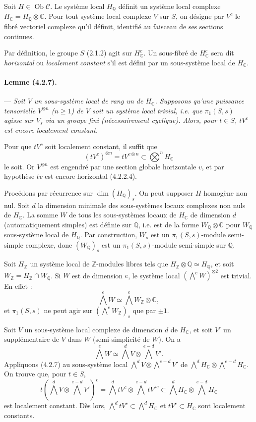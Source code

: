 \documentclass[10pt]{article}
\newcommand{\C}{\mathbb C}
\newcommand{\Q}{\mathbb Q}
\newcommand{\Z}{\mathbb Z}
\newcommand{\fg}{\guillemotright}
\newcommand{\og}{\guillemotleft}
\newcommand{\Ob}{\operatorname{Ob}}
\begin{document}
Soit $H\in\Ob\mathcal C$. Le système local $H_\Q$ définit un système local complexe $H_\C=H_\Q\otimes\C$. Pour tout système local complexe $V$ sur $S$, on désigne par $V^c$ le fibré vectoriel complexe qu'il définit, identifié au faisceau de ses sections continues.

Par définition, le groupe $S$ (2.1.2) agit sur $H_\C^c$. Un sous-fibré de $H_\C^c$ sera dit \emph{horizontal} ou \emph{localement constant} s'il est défini par un sous-système local de $H_\C$.

\paragraph{Lemme (4.2.7).} --- {\itshape Soit $V$ un sous-système local de rang un de $H_\C$. Supposons qu'une puissance tensorielle $V^{\otimes n}$ ($n\ge1$) de $V$ soit un système local trivial, i.e. que $\pi_1(S,s)$ agisse sur $V_s$ via un groupe fini (nécessairement cyclique). Alors, pour $t\in S$, $tV^c$ est encore localement constant.}

Pour que $tV^c$ soit localement constant, il suffit que
\[
(tV^c)^{\otimes n}=tV^{c\otimes n}\subset\bigotimes^n H_\C
\]
le soit. Or $V^{\otimes n}$ est engendré par une section globale horizontale $v$, et par hypothèse $tv$ est encore horizontal (4.2.2.4).

Procédons par récurrence sur $\dim(H_\Q)_s$. On peut supposer $H$ homogène non nul. Soit $d$ la dimension minimale des sous-systèmes locaux complexes non nuls de $H_\C$. La somme $W$ de tous les sous-systèmes locaux de $H_\C$ de dimension $d$ (automatiquement simples) est \og définie sur $\Q$\fg, i.e. est de la forme $W_\Q\otimes\C$ pour $W_\Q$ sous-système local de $H_\Q$. Par construction, $W_s$ est un $\pi_1(S,s)$-module semi-simple complexe, donc $(W_\Q)_s$ est un $\pi_1(S,s)$-module semi-simple sur $\Q$.

Soit $H_\Z$ un système local de $\Z$-modules libres tels que $H_\Z\otimes\Q\simeq H_\Q$, et soit $W_\Z=H_\Z\cap W_\Q$. Si $W$ est de dimension $e$, le système local $(\bigwedge^e W)^{\otimes2}$ est trivial. En effet :
\[
\bigwedge^e W\simeq \bigwedge^e W_\Z\otimes\C,
\]
et $\pi_1(S,s)$ ne peut agir sur $(\bigwedge^eW_\Z)_s$ que par $\pm1$.

Soit $V$ un sous-système local complexe de dimension $d$ de $H_\C$, et soit $V'$ un supplémentaire de $V$ dans $W$ (semi-simplicité de $W$). On a
\[
\bigwedge^e W\simeq \bigwedge^d V\otimes\bigwedge^{e-d}V'.
\]
Appliquons (4.2.7) au sous-système local $\bigwedge^dV\otimes\bigwedge^{e-d}V'$ de $\bigwedge^dH_\C\otimes\bigwedge^{e-d}H_\C$. On trouve que, pour $t\in S$,
\[
t(\bigwedge^dV\otimes\bigwedge^{e-d}V')^c=
\bigwedge^d tV^c\otimes\bigwedge^{e-d}tV'^c
\subset \bigwedge^dH_\C\otimes\bigwedge^{e-d}H_\C
\]
est localement constant. Dès lors, $\bigwedge^d tV^c\subset\bigwedge^dH_\C$ et $tV^c\subset H_\C$ sont localement constants.
\end{document}
